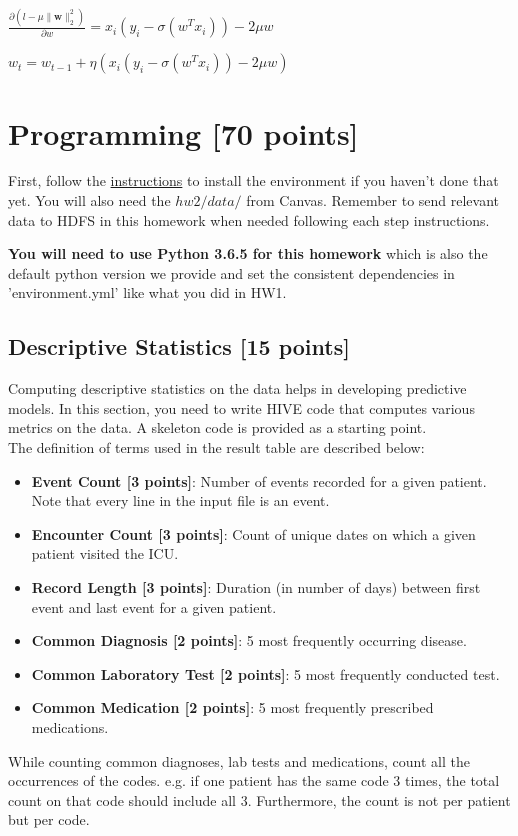 \documentclass[12pt]{article}
\begin{document}
\vspace{5mm}

$\frac{\partial (l - \mu \|\mathbf{w}\|_2^2)}{\partial w} = x_{i}(y_{i} - \sigma(w^T x_{i})) - 2 \mu w$

\vspace{5mm}

$w_{t} = w_{t-1} + \eta (x_{i}(y_{i} - \sigma(w^T x_{i})) - 2 \mu w)$

\vspace{5mm}

\section{Programming [70 points]}
First, follow the \href{http://www.sunlab.org/teaching/cse6250/fall2018/env/}{instructions} to install the environment if you haven't done that yet. You will also need the $hw2/data/$ from Canvas. Remember to send relevant data to HDFS in this homework when needed following each step instructions.

\textbf{You will need to use Python 3.6.5 for this homework} which is also the default python version we provide and set the consistent dependencies in 'environment.yml' like what you did in HW1. 


\subsection{Descriptive Statistics [15 points]}
Computing descriptive statistics on the data helps in developing predictive models. In this section, you need to write HIVE code that computes various metrics on the data. A skeleton code is provided as a starting point. \\

The definition of terms used in the result table are described below:
\begin{itemize}
\item \textbf{Event Count [3 points]}: Number of events recorded for a given patient. Note that every line in the input file is an event. 
\item \textbf{Encounter Count [3 points]}: Count of unique dates on which a given patient visited the ICU.
\item \textbf{Record Length [3 points]}: Duration (in number of days) between first event and last event for a given patient.
\item \textbf{Common Diagnosis [2 points]}: 5 most frequently occurring disease.
\item \textbf{Common Laboratory Test [2 points]}: 5 most frequently conducted test.
\item \textbf{Common Medication [2 points]}: 5 most frequently prescribed medications.
\end{itemize}
While counting common diagnoses, lab tests and medications, count all the occurrences of the codes. e.g. if one patient has the same code 3 times, the total count on that code should include all 3. Furthermore, the count is not per patient but per code.
\end{document}
